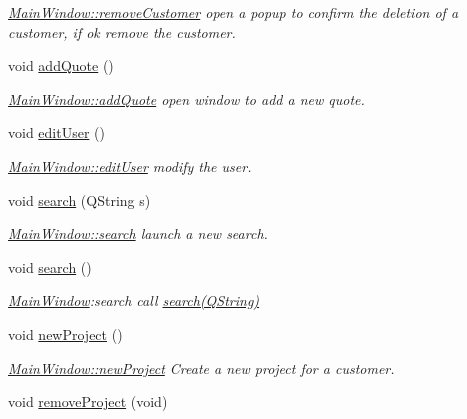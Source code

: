 \begin{DoxyCompactItemize}
\begin{DoxyCompactList}\small\item\em \hyperlink{classMainWindow_adb6fcfe64c3a11f28655e397b3accea9}{Main\+Window\+::remove\+Customer} open a popup to confirm the deletion of a customer, if ok remove the customer. \end{DoxyCompactList}\item 
void \hyperlink{classMainWindow_afd45bc05040ad2c44a35c020f687216d}{add\+Quote} ()
\begin{DoxyCompactList}\small\item\em \hyperlink{classMainWindow_afd45bc05040ad2c44a35c020f687216d}{Main\+Window\+::add\+Quote} open window to add a new quote. \end{DoxyCompactList}\item 
void \hyperlink{classMainWindow_a32fb574dece506733a3b80d2ccf565ac}{edit\+User} ()
\begin{DoxyCompactList}\small\item\em \hyperlink{classMainWindow_a32fb574dece506733a3b80d2ccf565ac}{Main\+Window\+::edit\+User} modify the user. \end{DoxyCompactList}\item 
void \hyperlink{classMainWindow_a62fcad69e9d32b98f3ac40a5a1d0f398}{search} (Q\+String s)
\begin{DoxyCompactList}\small\item\em \hyperlink{classMainWindow_a62fcad69e9d32b98f3ac40a5a1d0f398}{Main\+Window\+::search} launch a new search. \end{DoxyCompactList}\item 
\hypertarget{classMainWindow_a274dd0e068ebdc2a752e7ef05209fb2d}{void \hyperlink{classMainWindow_a274dd0e068ebdc2a752e7ef05209fb2d}{search} ()}\label{classMainWindow_a274dd0e068ebdc2a752e7ef05209fb2d}

\begin{DoxyCompactList}\small\item\em \hyperlink{classMainWindow}{Main\+Window}\+:search call \hyperlink{classMainWindow_a62fcad69e9d32b98f3ac40a5a1d0f398}{search(\+Q\+String)} \end{DoxyCompactList}\item 
void \hyperlink{classMainWindow_a7093a481f61ac3dfd682245aaf4c03fd}{new\+Project} ()
\begin{DoxyCompactList}\small\item\em \hyperlink{classMainWindow_a7093a481f61ac3dfd682245aaf4c03fd}{Main\+Window\+::new\+Project} Create a new project for a customer. \end{DoxyCompactList}\item 
\hypertarget{classMainWindow_acac126b5b24ba9027f6a0052aec10baf}{void \hyperlink{classMainWindow_acac126b5b24ba9027f6a0052aec10baf}{remove\+Project} (void)}\label{classMainWindow_acac126b5b24ba9027f6a0052aec10baf}


\end{DoxyCompactItemize}
